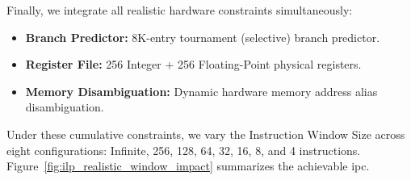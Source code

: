 Finally, we integrate all realistic hardware constraints simultaneously:
\begin{itemize}
    \item \textbf{Branch Predictor:} 8K-entry tournament (selective) branch predictor.
    \item \textbf{Register File:} 256 Integer + 256 Floating-Point physical registers.
    \item \textbf{Memory Disambiguation:} Dynamic hardware memory address alias disambiguation.
\end{itemize}

Under these cumulative constraints, we vary the Instruction Window Size across eight configurations: Infinite, 256, 128, 64, 32, 16, 8, and 4 instructions. Figure~\ref{fig:ilp_realistic_window_impact} summarizes the achievable \gls{ipc}.


